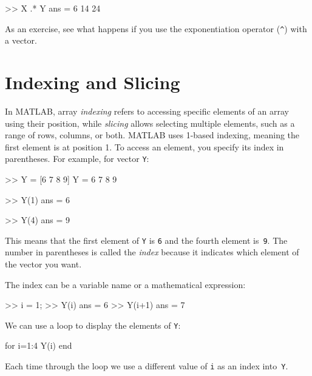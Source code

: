 
\begin{code}
>> X .* Y
ans = 6    14    24
\end{code}

As an exercise, see what happens if you use the exponentiation operator
(\lstinline{^}) with a vector.

\section{Indexing and Slicing}

In MATLAB, array \emph{indexing} refers to accessing specific elements of an array using their position, while \emph{slicing} allows selecting multiple elements, such as a range of rows, columns, or both.  MATLAB uses 1-based indexing, meaning the first element is at position 1. To access an element, you specify its index in parentheses. For example, for vector \lstinline{Y}:



\begin{code}
>> Y = [6 7 8 9]
Y = 6    7     8     9

>> Y(1)
ans = 6

>> Y(4)
ans = 9
\end{code}

This means that the first element of \lstinline{Y} is \lstinline{6} and the
fourth element is~\lstinline{9}.  
The number in parentheses is called the \emph{index} because it indicates which element of the vector you want.


The index can be a variable name or a mathematical expression:

\begin{code}
>> i = 1;
>> Y(i)
ans = 6
>> Y(i+1)
ans = 7
\end{code}

We can use a loop to display the elements of \lstinline{Y}:


\begin{code}
for i=1:4
     Y(i)
end
\end{code}

Each time through the loop we use a different value of \lstinline{i}
as an index into~\lstinline{Y}.


